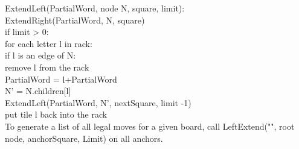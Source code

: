 \documentclass[12pt]{article}
\begin{document}
	ExtendLeft(PartialWord, node N, square, limit):\\
		ExtendRight(PartialWord, N, square)\\
		if limit > 0: \\
			for each letter l in rack: \\
				if l is an edge of N: \\
					remove l from the rack\\
					PartialWord = l+PartialWord\\
					N' = N.children[l]\\
					ExtendLeft(PartialWord, N', nextSquare, limit -1)\\
					put tile l back into the rack\\
			
To generate a list of all legal moves for a given board, call
LeftExtend("", root node, anchorSquare, Limit) on all anchors.



\end{document}
